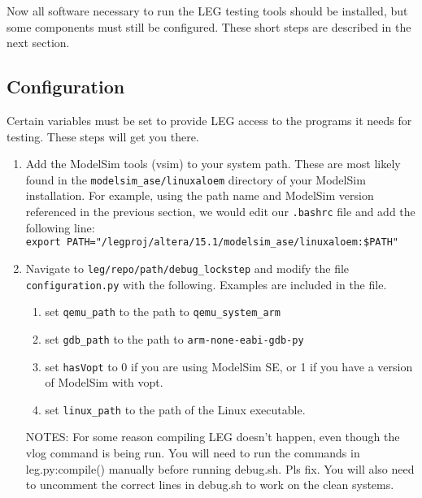 Now all software necessary to run the LEG testing tools should be installed, but some components must still be configured.
These short steps are described in the next section.

\subsection{Configuration}

Certain variables must be set to provide LEG access to the programs it needs for testing.
These steps will get you there.

\begin{enumerate}
\item Add the ModelSim tools (vsim) to your system path.
These are most likely found in the \texttt{modelsim\_ase/linuxaloem} directory of your ModelSim installation.
For example, using the path name and ModelSim version referenced in the previous section, we would edit our \texttt{.bashrc} file and add the following line: \\\texttt{export PATH="/legproj/altera/15.1/modelsim\_ase/linuxaloem:\$PATH"}

\item Navigate to \texttt{leg/repo/path/debug\_lockstep} and modify the file \texttt{config\-uration.py} with the following. 
Examples are included in the file.
	\begin{enumerate}
		\item set \texttt{qemu\_path} to the path to \texttt{qemu\_system\_arm}
		\item set \texttt{gdb\_path} to the path to \texttt{arm-none-eabi-gdb-py}
		\item set \texttt{hasVopt} to 0 if you are using ModelSim SE, or 1 if you have a version of ModelSim with vopt.
		\item set \texttt{linux\_path} to the path of the Linux executable.
	\end{enumerate}

NOTES: For some reason compiling LEG doesn't happen, even though the vlog command is being run. 
You will need to run the commands in leg.py:compile() manually before running debug.sh.
Pls fix.
You will also need to uncomment the correct lines in debug.sh to work on the clean systems. 
\end{enumerate}









